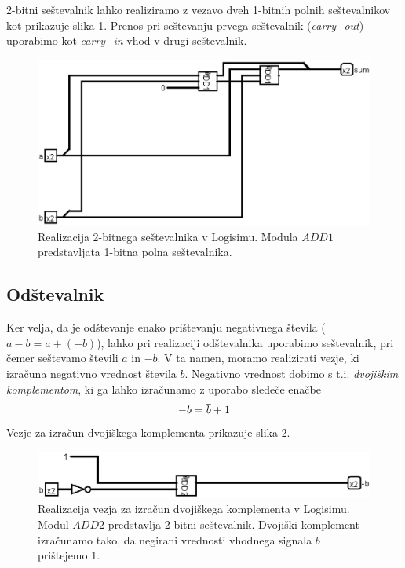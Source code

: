 2-bitni seštevalnik lahko realiziramo z vezavo dveh 1-bitnih polnih seštevalnikov kot prikazuje slika \ref{fig:add_2bit}. Prenos pri seštevanju prvega seštevalnik (\emph{carry\_out}) uporabimo kot \emph{carry\_in} vhod v drugi seštevalnik.

\begin{figure}
\begin{center}
\includegraphics[width=0.75\columnwidth]{procesor/img/add_2bit}%
\caption{Realizacija 2-bitnega seštevalnika v Logisimu. Modula $ADD1$ predstavljata 1-bitna polna seštevalnika.}%
\label{fig:add_2bit}%
\end{center}
\end{figure}

\subsection{Odštevalnik}
\label{sec:odstevalnik}
Ker velja, da je odštevanje enako prištevanju negativnega števila ($a-b=a+(-b)$), lahko pri realizaciji odštevalnika uporabimo seštevalnik, pri čemer seštevamo števili $a$ in $-b$. V ta namen, moramo realizirati vezje, ki izračuna negativno vrednost števila $b$. Negativno vrednost dobimo s t.i. \emph{dvojiškim komplementom}, ki ga lahko izračunamo z uporabo sledeče enačbe
$$
- b = \overline{b} + 1
$$
Vezje za izračun dvojiškega komplementa prikazuje slika \ref{fig:complement}.
\begin{figure}
\begin{center}
\includegraphics[width=0.75\columnwidth]{procesor/img/complement}%
\caption{Realizacija vezja za izračun dvojiškega komplementa v Logisimu. Modul $ADD2$ predstavlja 2-bitni seštevalnik. Dvojiški komplement izračunamo tako, da negirani vrednosti vhodnega signala $b$ prištejemo 1.}%
\label{fig:complement}%
\end{center}
\end{figure}

